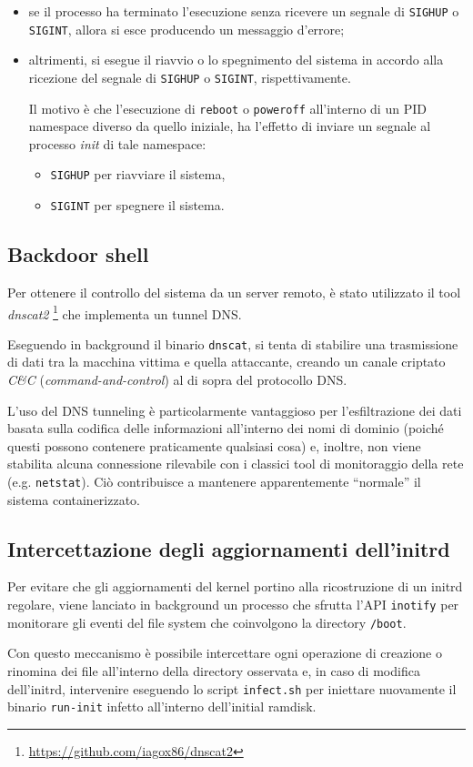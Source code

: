 \documentclass{article}
\begin{document}
\begin{itemize}
	\item se il processo ha terminato l'esecuzione senza ricevere un segnale di \texttt{SIGHUP} o \texttt{SIGINT}, allora si esce producendo un messaggio d'errore;
	\item altrimenti, si esegue il riavvio o lo spegnimento del sistema in accordo alla ricezione del segnale di \texttt{SIGHUP} o \texttt{SIGINT}, rispettivamente.
	
	Il motivo è che l'esecuzione di \texttt{reboot} o \texttt{poweroff} all'interno di un PID namespace diverso da quello iniziale, ha l'effetto di inviare un segnale al processo \textsl{init} di tale namespace:
	\begin{itemize}
		\item \texttt{SIGHUP} per riavviare il sistema,
		\item \texttt{SIGINT} per spegnere il sistema.
	\end{itemize}
\end{itemize}

\subsection{Backdoor shell}
Per ottenere il controllo del sistema da un server remoto, è stato utilizzato il tool \textsl{dnscat2} \footnote{\url{https://github.com/iagox86/dnscat2}} che implementa un tunnel DNS.

Eseguendo in background il binario \texttt{dnscat}, si tenta di stabilire una trasmissione di dati tra la macchina vittima e quella attaccante, creando un canale criptato \textsl{C\&C} (\textsl{command-and-control}) al di sopra del protocollo DNS.

L'uso del DNS tunneling è particolarmente vantaggioso per l'esfiltrazione dei dati basata sulla codifica delle informazioni all'interno dei nomi di dominio (poiché questi possono contenere praticamente qualsiasi cosa) e, inoltre, non viene stabilita alcuna connessione rilevabile con i classici tool di monitoraggio della rete (e.g. \texttt{netstat}). Ciò contribuisce a mantenere apparentemente ``normale'' il sistema containerizzato.

\subsection{Intercettazione degli aggiornamenti dell'initrd}
Per evitare che gli aggiornamenti del kernel portino alla ricostruzione di un initrd regolare, viene lanciato in background un processo che sfrutta l'API \texttt{inotify} per monitorare gli eventi del file system che coinvolgono la directory \texttt{/boot}.

Con questo meccanismo è possibile intercettare ogni operazione di creazione o rinomina dei file all'interno della directory osservata e, in caso di modifica dell'initrd, intervenire eseguendo lo script \texttt{infect.sh} per iniettare nuovamente il binario \texttt{run-init} infetto all'interno dell'initial ramdisk.
\end{document}
